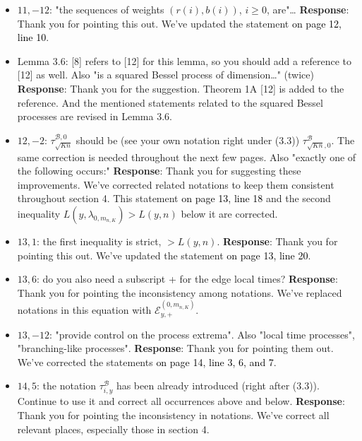 \documentclass[11pt,a4paper]{article}
\numberwithin{equation}{section}
\newcommand{\PL}[2]{\textcolor{black}{on page {#1}, line {#2}}}
\begin{document}
\begin{itemize}
		
		\item 
		$11,-12$: "the sequences of weights $(r(i), b(i))$, $i \geq 0$, are"\dots
		\subitem \textbf{Response}: Thank you for pointing this out.  We've updated the statement \PL{12}{10}. 
		
		\item 
		Lemma 3.6: [8] refers to [12] for this lemma, so you should add a reference to [12] as well. Also "is a squared Bessel process of dimension\dots " (twice)
		\subitem \textbf{Response}: Thank you for the suggestion. Theorem 1A [12] is added to the reference. And the mentioned statements related to the squared Bessel processes are revised in Lemma 3.6. 
		
		
		\item 
		$12,-2$: $\tau^{\mathcal{B},0}_{\sqrt{Kn}}$ should be (see your own notation right under (3.3)) $\tau^{\mathcal{B}}_{\sqrt{Kn},0}$. The same correction is
		needed throughout the next few pages. Also "exactly one of the following occurs:"
		\subitem \textbf{Response}:  Thank you for suggesting these improvements. We've corrected related notations to keep them consistent throughout section 4. This statement \PL{13}{18} and the second inequality $L(y, \lambda_{0,m_{n,K}} )>L(y,n)$ below it are corrected.
		
		\item 
		$13,1$: the first inequality is strict, $> L(y, n)$.
		\subitem \textbf{Response}: Thank you for pointing this out.  We've updated the statement \PL{13}{20}.
		
		\item 
		$13,6$: do you also need a subscript + for the edge local times?
		\subitem \textbf{Response}: Thank you for pointing the inconsistency among notations. We've replaced notations in this equation with $\mathcal{E}_{y,+}^{(0,m_{n,K})}  $.
		
		\item 
		$13,-12$: "provide control on the process extrema". Also "local time processes", "branching-like processes".
		\subitem \textbf{Response}: Thank you for pointing them out.  We've corrected the statements \PL{14}{3, 6, and 7}. 
		
		\item 
		$14,5$: the notation $\tau^{\mathcal{B}}_{i,y}$ has been already introduced (right after (3.3)). Continue to use it and correct all occurrences above and below.
		\subitem \textbf{Response}: Thank you for pointing the inconsistency in notations. We've correct all relevant places, especially those in section 4. 
		

\end{itemize}
\end{document}
